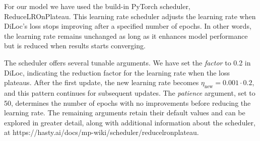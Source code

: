 \documentclass[a4paper, UKenglish, 11pt]{uiomaster}
\begin{document}
For our model we have used the build-in PyTorch scheduler, ReduceLROnPlateau. This learning rate scheduler adjusts the learning rate when DiLoc's loss stops improving after a specified number of epochs. In other words, the learning rate remains unchanged as long as it enhances model performance but is reduced when results starts converging.

The scheduler offers several tunable arguments. We have set the \emph{factor} to 0.2 in DiLoc, indicating the reduction factor for the learning rate when the loss plateaus. After the first update, the new learning rate becomes $\eta_{\text{new}} = 0.001 \cdot 0.2$, and this pattern continues for subsequent updates. The \emph{patience} argument, set to 50, determines the number of epochs with no improvements before reducing the learning rate. The remaining arguments retain their default values and can be explored in greater detail, along with additional information about the scheduler, at https://hasty.ai/docs/mp-wiki/scheduler/reducelronplateau.





\end{document}
